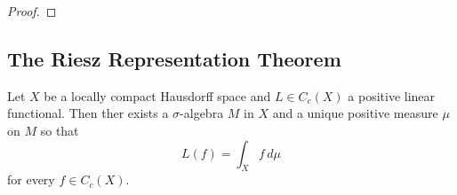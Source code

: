 \begin{proof}
\end{proof}
\bigskip


\subsection{The Riesz Representation Theorem}
\bigskip

\begin{theorem}\label{thm:riesz_representation}
    Let \( X \) be a locally compact Hausdorff space and \( L \in C_c(X) \) a positive linear functional.
    Then ther exists a \( \sigma \)-algebra \( M \) in \( X \) and a unique positive measure
    \( \mu \) on \( M \) so that
    \[
        L(f) = \int_X f\,d\mu
    \]
    for every \( f \in C_c(X) \).
\end{theorem}
\bigskip
